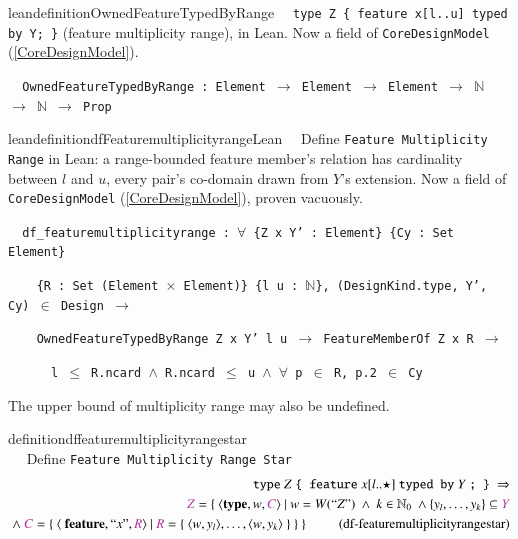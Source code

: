 \begin{restatable}{leandefinition}{OwnedFeatureTypedByRange}~~ \texttt{type Z \{
feature x[l..u] typed by Y; \}} (feature multiplicity range), in Lean. Now a field of
\texttt{CoreDesignModel} (\ref{CoreDesignModel}).

\texttt{~~OwnedFeatureTypedByRange : Element $\to$ Element $\to$ Element $\to$ $\mathbb{N}$ $\to$ $\mathbb{N}$ $\to$ Prop}
\label{OwnedFeatureTypedByRange}
\end{restatable}

\begin{restatable}{leandefinition}{dfFeaturemultiplicityrangeLean}~~ Define
\texttt{Feature Multiplicity Range} in Lean: a range-bounded feature member's relation has cardinality
between $l$ and $u$, every pair's co-domain drawn from $Y$'s extension. Now a field of
\texttt{CoreDesignModel} (\ref{CoreDesignModel}), proven vacuously.

\texttt{~~df\_featuremultiplicityrange : $\forall$ \{Z x Y' : Element\} \{Cy : Set Element\}}

\texttt{~~~~\{R : Set (Element $\times$ Element)\} \{l u : $\mathbb{N}$\}, (DesignKind.type, Y', Cy) $\in$ Design $\to$}

\texttt{~~~~OwnedFeatureTypedByRange Z x Y' l u $\to$ FeatureMemberOf Z x R $\to$}

\texttt{~~~~~~l $\le$ R.ncard $\wedge$ R.ncard $\le$ u $\wedge$ $\forall$ p $\in$ R, p.2 $\in$ Cy}
\label{df_featuremultiplicityrange}
\end{restatable}

\pn The upper bound of multiplicity range may also be undefined.

\begin{restatable}{definition}{dffeaturemultiplicityrangestar}~~ \\~~  Define \texttt{Feature Multiplicity Range Star}
\begin{align}
\texttt{type}~ Z ~\texttt{\{ feature}~ x[l..\star] ~\texttt{typed by}~ Y~\texttt{; \}}~\Rightarrow  \notag \\
\mc{Z}=\{~\langle \textbf{type},w,\mc{C}\rangle~\vert~w=W(``Z")~\wedge~k \in \mathbb{N}_0~\wedge \{ y_l,\ldots,y_k \} \subseteq \mc{Y} \notag \\
~\wedge~ \mc{C}=\{~\langle~\textbf{feature}, ``x",\mc{R} \rangle~\vert ~\mc{R}=\{~\langle w,y_l\rangle,\ldots,\langle w,y_k\rangle~\}~\}~\}~~\label{eq:df-featuremultiplicityrangestar}\tag{df-featuremultiplicityrangestar}
\end{align}
\end{restatable}

